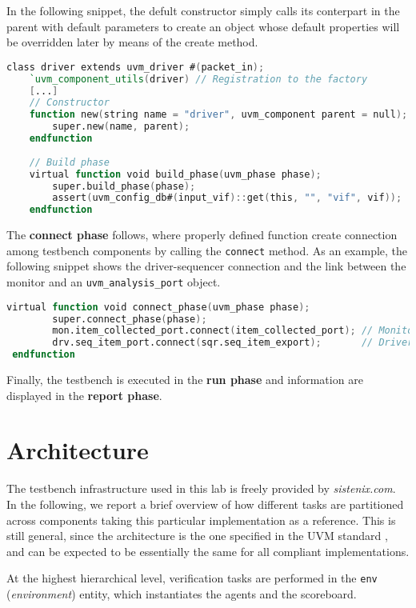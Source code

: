 In the following snippet, the defult constructor simply calls its conterpart in the parent with default parameters to create an object whose default properties will be overridden later by means of the create method.

\begin{lstlisting}[language=verilog, label=driver]
class driver extends uvm_driver #(packet_in);
	`uvm_component_utils(driver) // Registration to the factory
	[...]
	// Constructor
	function new(string name = "driver", uvm_component parent = null);
		super.new(name, parent);
	endfunction
	
	// Build phase
	virtual function void build_phase(uvm_phase phase);
		super.build_phase(phase);
		assert(uvm_config_db#(input_vif)::get(this, "", "vif", vif));
	endfunction
\end{lstlisting}

The \textbf{connect phase} follows, where properly defined function create connection among testbench components by calling the \texttt{connect} method. As an example, the following snippet
shows the driver-sequencer connection and the link between the monitor and an \texttt{uvm\_analysis\_port} object.

\begin{lstlisting}[language=verilog, caption=Creation phase from the agent]
 virtual function void connect_phase(uvm_phase phase);
		super.connect_phase(phase);
		mon.item_collected_port.connect(item_collected_port); // Monitor connection
		drv.seq_item_port.connect(sqr.seq_item_export);       // Driver connection with sequencer
 endfunction
	\end{lstlisting}

Finally, the testbench is executed in the \textbf{run phase} and information are displayed in  the \textbf{report phase}.
\section{Architecture}
The testbench infrastructure used in this lab is freely provided by \textit{sistenix.com}. In the following, we report a brief overview of how different tasks are partitioned across components taking this particular implementation as a reference. This is still general, since the architecture is the one specified in the UVM standard \cite{uvm_book}, and can be expected to be essentially the same for all compliant implementations.

At the highest hierarchical level, verification tasks are performed in the \texttt{env} (\textit{environment}) entity, which instantiates the agents and the scoreboard.

